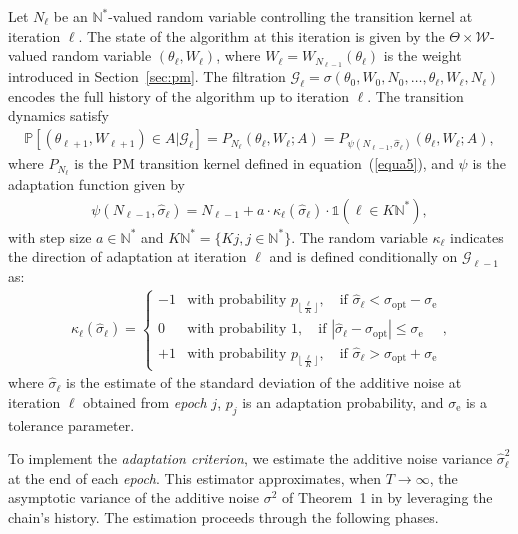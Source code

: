\documentclass[pdflatex,sn-mathphys-num]{sn-jnl}
\newcommand{\nats}{\mathbb{N}}
\newcommand{\ind}{\mathds{1}}
\newcommand{\natsstar}{\mathbb{N}^*}
\renewcommand{\leq}{\leqslant}
\theoremstyle{thmstyleone}
\theoremstyle{thmstyletwo}
\theoremstyle{thmstylethree}
\begin{document}
Let $N_\ell$ be an $\mathbb{N}^*$-valued random variable controlling the transition kernel at iteration $\ell$. The state of the algorithm at this iteration is given by the $\Theta \times \mathcal{W}$-valued random variable $(\theta_\ell, W_\ell)$, where $W_\ell= W_{N_{\ell-1}}(\theta_\ell)$ is the weight introduced in Section~\ref{sec:pm}. The filtration $\mathcal{G}_\ell = \sigma(\theta_0, W_0, N_0, \ldots, \theta_\ell, W_\ell, N_\ell)$ encodes the full history of the algorithm up to iteration $\ell$. The transition dynamics satisfy
\begin{align}
    \mathbb{P}\left[(\theta_{\ell+1}, W_{\ell+1}) \in A |\mathcal{G}_\ell\right] = P_{N_\ell}(\theta_\ell, W_\ell; A) = P_{\psi(N_{\ell-1}, \hat\sigma_\ell)}(\theta_\ell, W_\ell; A),
    \label{adaptivetransition}
\end{align}
where $P_{N_\ell}$ is the PM transition kernel defined in equation~(\ref{equa5}), and $\psi$ is the adaptation function given by
\begin{align*}
\psi(N_{\ell-1}, \hat{\sigma}_\ell) = N_{\ell-1} + a \cdot \kappa_\ell (\hat\sigma_\ell) \cdot \ind(\ell \in K\nats^*),
\end{align*}
with step size \( a \in \natsstar \) and $K\nats^*=\{Kj , j \in \natsstar\}$. The random variable $\kappa_\ell$ indicates the direction of adaptation at iteration $\ell$ and is defined conditionally on $\mathcal{G}_{\ell-1}$ as:
\begin{align*}
\kappa_\ell(\hat\sigma_\ell) = 
\begin{cases}
-1 & \text{with probability } p_{\lfloor \frac{\ell}{K} \rfloor}, \quad \text{if } \hat{\sigma}_\ell < {\sigma}_{\text{opt}} - \sigma_{\text{e}} \\
0 & \text{with probability } 1, \quad \text{if } |\hat{\sigma}_\ell - {\sigma}_{\text{opt}}| \leq \sigma_{\text{e}} \\
+1 & \text{with probability } p_{\lfloor \frac{\ell}{K} \rfloor}, \quad \text{if } \hat{\sigma}_\ell > {\sigma}_{\text{opt}} + \sigma_{\text{e}}
\end{cases},
\end{align*}
where $\hat{\sigma}_\ell$ is the estimate of the standard deviation of the additive noise at iteration $\ell$ obtained from  \textit{epoch} $j$, $p_j$ is an adaptation probability, and $\sigma_{\text{e}}$ is a tolerance parameter. 

To implement the \textit{adaptation criterion}, we estimate the additive noise variance $\hat{\sigma}_\ell^2$ at the end of each \textit{epoch}. This estimator approximates, when $T \to \infty$, the asymptotic variance of the additive noise $\sigma^2$ of Theorem~1 in \cite{schmon_large-sample_2021} by leveraging the chain's history. The estimation proceeds through the following phases.
\end{document}
